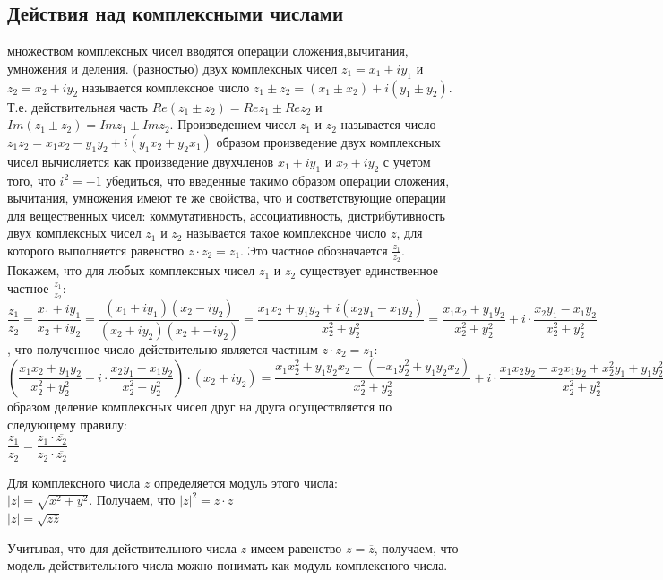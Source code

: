 \documentclass[oneside]{book}
\begin{document}
\begin{itemize}
\begin{enumerate}
\section{Действия над комплексными числами}
 множеством комплексных чисел вводятся операции сложения,вычитания, умножения и деления.
 (разностью) двух комплексных чисел $z_1=x_1+iy_1$ и $z_2=x_2+iy_2$ называется комплексное число $z_1\pm z_2=(x_1 \pm x_2)+i(y_1\pm y_2)$. Т.е. действительная часть $Re(z_1\pm z_2)=Rez_1\pm Rez_2$ и $Im(z_1\pm z_2)=Imz_1\pm Imz_2$. Произведением чисел $z_1$ и $z_2$ называется число $z_1z_2=x_1x_2-y_1y_2+i(y_1x_2+y_2x_1)$
 образом произведение двух комплексных чисел вычисляется как произведение двухчленов $x_1+iy_1$ и $x_2+iy_2$ с учетом того, что $i^2=-1$
 убедиться, что введенные такимо образом операции сложения, вычитания, умножения имеют те же свойства, что и соответствующие операции для вещественных чисел: коммутативность, ассоциативность, дистрибутивность
 двух комплексных чисел $z_1$ и $z_2$ называется такое комплексное число $z$, для которого выполняется равенство $z\cdot z_2=z_1$. Это частное обозначается $\frac{z_1}{z_2}$. Покажем, что для любых комплексных чисел $z_1$ и $z_2$ существует единственное частное $\frac{z_1}{z_2}$:\\
$\dfrac{z_1}{z_2}=\dfrac{x_1+iy_1}{x_2+iy_2}=\dfrac{(x_1+iy_1)(x_2-iy_2)}{(x_2+iy_2)(x_2+-iy_2)}=\dfrac{x_1x_2+y_1y_2+i(x_2y_1-x_1y_2)}{x_2^2+y_2^2}=\dfrac{x_1x_2+y_1y_2}{x_2^2+y_2^2}+i\cdot \dfrac{x_2y_1-x_1y_2}{x_2^2+y_2^2}$
, что полученное число действительно является частным $z\cdot z_2=z_1$:\\
$(\dfrac{x_1x_2+y_1y_2}{x_2^2+y_2^2}+i\cdot \dfrac{x_2y_1-x_1y_2}{x_2^2+y_2^2})\cdot (x_2+iy_2)=\dfrac{x_1x_2^2+y_1y_2x_2-(-x_1y_2^2+y_1y_2x_2)}{x_2^2+y_2^2}+i\cdot \dfrac{x_1x_2y_2-x_2x_1y_2+x_2^2y_1+y_1y_2^2}{x_2^2+y_2^2}=\dfrac{x_1(x_2^2+y_2^2)}{x_2^2+y_2^2}+i\cdot \dfrac{y_1(x_2^2+y_2^2)}{x_2^2+y_2^2}=x_1+iy_1=z_1$
 образом деление комплексных чисел друг на друга осуществляется по следующему правилу:\\
$\dfrac{z_1}{z_2}=\dfrac{z_1\cdot \overline{z_2}}{z_2\cdot \overline{z_2}}$
\par Для комплексного числа $z$ определяется модуль этого числа: \\$|z|=\sqrt{x^2+y^2}$. Получаем, что $|z|^2=z\cdot \overline{z}$\\
$|z|=\sqrt{z\overline{z}}$
\par Учитывая, что для действительного числа $z$ имеем равенство $z=\overline{z}$, получаем, что модель действительного числа можно понимать как модуль комплексного числа.

\end{enumerate}
\end{itemize}
\end{document}
